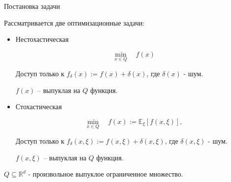 \documentclass{beamer}
\begin{document}
\begin{frame}{Постановка задачи}

    Рассматривается две оптимизационные задачи:\\

    \begin{itemize}
        \item Нестохастическая
                
                \begin{equation*}
                    \underset{x \in Q}{\min} \quad f(x)
                \end{equation*}

            Доступ только к $f_{\delta}(x) := f(x) + \delta(x)$, где $\delta(x)$ - шум.

            $f(x)$ -- выпуклая на $Q$ функция.

        \item Стохастическая
        
                \begin{equation*}
                    \underset{x \in Q}{\min} \quad f(x) := 
                    \mathbb{E}_{\xi}\left[f(x, \xi)\right],
                \end{equation*}

                
            Доступ только к $f_{\delta}(x, \xi) := f(x, \xi) + \delta(x, \xi)$, где $\delta(x, \xi)$ - шум.

            $f(x, \xi)$ -- выпуклая на $Q$ функция.

    \end{itemize}

        $Q \subseteq \mathbb{R}^d$ - произвольное выпуклое ограниченное множество.
   
\end{frame}





\end{document}
